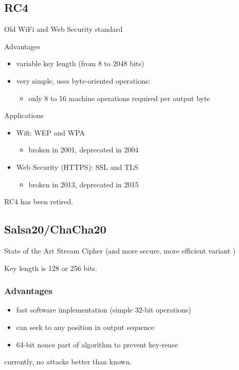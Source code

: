 \documentclass[final]{article}
\begin{document}
\subsection{RC4}
Old WiFi and Web Security standard

Advantages
\begin{itemize}[nosep]
    \item variable key length (from 8 to 2048 bits)
    \item very simple, uses byte-oriented operations:
          \begin{itemize}[nosep]\item only 8 to 16 machine operations required per output byte\end{itemize}
\end{itemize}
Applications
\begin{itemize}[nosep]
    \item Wifi: WEP and WPA
          \begin{itemize}[nosep]\item broken in 2001, deprecated in 2004\end{itemize}
    \item Web Security (HTTPS): SSL and TLS
          \begin{itemize}[nosep]\item broken in 2013, deprecated in 2015\end{itemize}
\end{itemize}
RC4 has been retired.
\subsection{Salsa20/ChaCha20}
State of the Art Stream Cipher
 (and more secure, more efficient variant )

Key length is 128 or 256 bits.

\subsubsection*{Advantages}
\begin{itemize}[nosep]
    \item fast software implementation (simple 32-bit operations)
    \item can seek to any position in output sequence
    \item 64-bit nonce part of algorithm to prevent key-reuse
\end{itemize}
currently, no attacks better than  known.
\end{document}
